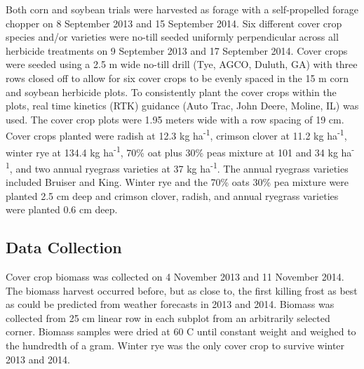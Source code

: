 \documentclass[agriculture,article,submit,moreauthors,pdftex]{mdpi}
\begin{document}
Both corn and soybean trials were harvested as forage with a
self-propelled forage chopper on 8 September 2013 and 15 September 2014.
Six different cover crop species and/or varieties were no-till seeded
uniformly perpendicular across all herbicide treatments on 9 September
2013 and 17 September 2014. Cover crops were seeded using a 2.5 m wide
no-till drill (Tye, AGCO, Duluth, GA) with three rows closed off to
allow for six cover crops to be evenly spaced in the 15 m corn and
soybean herbicide plots. To consistently plant the cover crops within
the plots, real time kinetics (RTK) guidance (Auto Trac, John Deere,
Moline, IL) was used. The cover crop plots were 1.95 meters wide with a
row spacing of 19 cm. Cover crops planted were radish at 12.3 kg
ha\textsuperscript{-1}, crimson clover at 11.2 kg
ha\textsuperscript{-1}, winter rye at 134.4 kg ha\textsuperscript{-1},
70\% oat plus 30\% peas mixture at 101 and 34 kg ha\textsuperscript{-1},
and two annual ryegrass varieties at 37 kg ha\textsuperscript{-1}. The
annual ryegrass varieties included Bruiser and King. Winter rye and the
70\% oats 30\% pea mixture were planted 2.5 cm deep and crimson clover,
radish, and annual ryegrass varieties were planted 0.6 cm deep.

\hypertarget{data-collection}{%
\subsection{Data Collection}\label{data-collection}}

Cover crop biomass was collected on 4 November 2013 and 11 November
2014. The biomass harvest occurred before, but as close to, the first
killing frost as best as could be predicted from weather forecasts in
2013 and 2014. Biomass was collected from 25 cm linear row in each
subplot from an arbitrarily selected corner. Biomass samples were dried
at 60 C until constant weight and weighed to the hundredth of a gram.
Winter rye was the only cover crop to survive winter 2013 and 2014.
\end{document}
